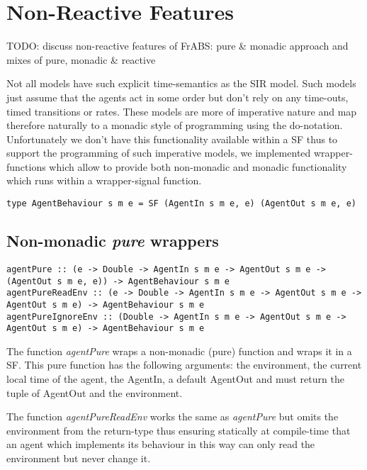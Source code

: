 \section{Non-Reactive Features}
TODO: discuss non-reactive features of FrABS: pure \& monadic approach and mixes of pure, monadic \& reactive

Not all models have such explicit time-semantics as the SIR model. Such models just assume that the agents act in some order but don't rely on any time-outs, timed transitions or rates. These models are more of imperative nature and map therefore naturally to a monadic style of programming using the do-notation. Unfortunately we don't have this functionality available within a SF thus to support the programming of such imperative models, we implemented wrapper-functions which allow to provide both non-monadic and monadic functionality which runs within a wrapper-signal function.

\begin{verbatim}
type AgentBehaviour s m e = SF (AgentIn s m e, e) (AgentOut s m e, e)
\end{verbatim}

\subsection{Non-monadic \textit{pure} wrappers}

\begin{verbatim}
agentPure :: (e -> Double -> AgentIn s m e -> AgentOut s m e -> (AgentOut s m e, e)) -> AgentBehaviour s m e
agentPureReadEnv :: (e -> Double -> AgentIn s m e -> AgentOut s m e -> AgentOut s m e) -> AgentBehaviour s m e
agentPureIgnoreEnv :: (Double -> AgentIn s m e -> AgentOut s m e -> AgentOut s m e) -> AgentBehaviour s m e
\end{verbatim}

The function \textit{agentPure} wraps a non-monadic (pure) function and wraps it in a SF. This pure function has the following arguments: the environment, the current local time of the agent, the AgentIn, a default AgentOut and must return the tuple of AgentOut and the environment.

The function \textit{agentPureReadEnv} works the same as \textit{agentPure} but omits the environment from the return-type thus ensuring statically at compile-time that an agent which implements its behaviour in this way can only read the environment but never change it.

